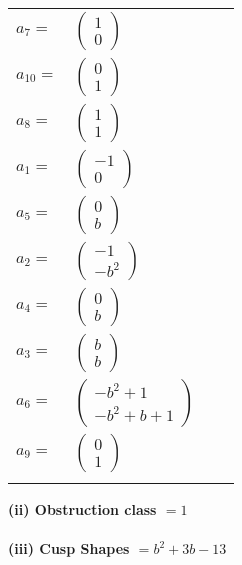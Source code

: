 \documentclass[1p]{elsarticle_modified}
\theoremstyle{definition}
\begin{document}
\begin{tabular}{m{7pt} m{180pt} m{7pt} m{180pt} }
\flushright $a_{7}=$&$\begin{pmatrix}1\\0\end{pmatrix}$ \\
\flushright $a_{10}=$&$\begin{pmatrix}0\\1\end{pmatrix}$ \\
\flushright $a_{8}=$&$\begin{pmatrix}1\\1\end{pmatrix}$ \\
\flushright $a_{1}=$&$\begin{pmatrix}-1\\0\end{pmatrix}$ \\
\flushright $a_{5}=$&$\begin{pmatrix}0\\b\end{pmatrix}$ \\
\flushright $a_{2}=$&$\begin{pmatrix}-1\\- b^2\end{pmatrix}$ \\
\flushright $a_{4}=$&$\begin{pmatrix}0\\b\end{pmatrix}$ \\
\flushright $a_{3}=$&$\begin{pmatrix}b\\b\end{pmatrix}$ \\
\flushright $a_{6}=$&$\begin{pmatrix}- b^2+1\\- b^2+b+1\end{pmatrix}$ \\
\flushright $a_{9}=$&$\begin{pmatrix}0\\1\end{pmatrix}$\\&\end{tabular}
\flushleft \textbf{(ii) Obstruction class $= 1$}\\~\\
\flushleft \textbf{(iii) Cusp Shapes $= b^2+3 b-13$}\\~\\
\end{document}

